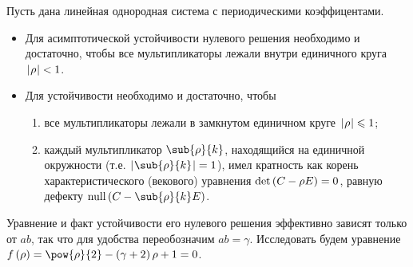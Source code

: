 \documentclass[a5paper,10pt]{article}
\begin{document}
\begin{framed}
    \begin{criteria} \end{criteria}
    Пусть дана линейная однородная система с периодическими коэффицентами.
    \begin{itemize}
        \item Для асимптотической устойчивости нулевого решения необходимо и достаточно,
        чтобы все мультипликаторы лежали внутри единичного круга $\hspace{0.2mm}\left|\hspace{0.06em}\rho\hspace{0.06em}\right| < 1$.
        \item Для устойчивости необходимо и достаточно, чтобы
        \begin{enumerate}
            \item все мультипликаторы лежали в замкнутом единичном круге $\hspace{0.2mm}\left|\hspace{0.06em}\rho\hspace{0.06em}\right| \leqslant 1$;
            \item каждый мультипликатор $\sub{\rho}{k}$,
            находящийся на единичной окружности \linebreak (т.е. $\vbr{\sub{\rho}{k}} = 1$), 
            имел кратность как корень характеристического (векового) \linebreak уравнения 
            $\det\left(\hspace{0.01em}C - \rho E\hspace{0.01em}\right) = 0$, равную дефекту $\nullity\br{C - \sub{\rho}{k} E}$.
        \end{enumerate}
    \end{itemize}
\end{framed}

Уравнение и факт устойчивости его нулевого решения эффективно зависят только от $ab$,
так что для удобства переобозначим $ab = \gamma$. Исследовать будем уравнение
$f\br{\rho} = \pow{\rho}{2} - \br{\gamma + 2}\rho + 1 = 0$.
\end{document}
